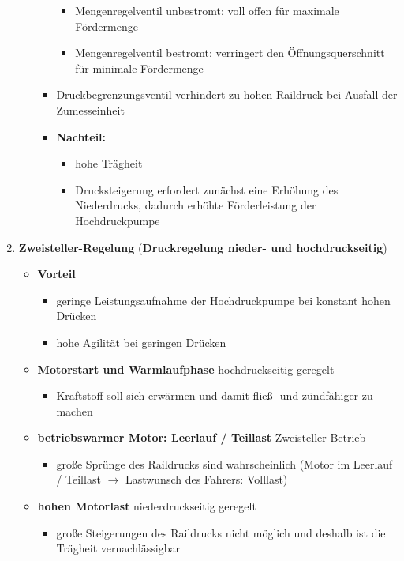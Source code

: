 \begin{enumerate}
\begin{itemize}
\begin{itemize}
      \begin{itemize}
      \item
        Mengenregelventil unbestromt: voll offen für maximale
        Fördermenge
      \item
        Mengenregelventil bestromt: verringert den Öffnungsquerschnitt
        für minimale Fördermenge\\
      \end{itemize}
    \item
      Druckbegrenzungsventil verhindert zu hohen Raildruck bei Ausfall
      der Zumesseinheit
    \item
      \textbf{Nachteil:}

      \begin{itemize}
      \item
        hohe Trägheit
      \item
        Drucksteigerung erfordert zunächst eine Erhöhung des
        Niederdrucks, dadurch erhöhte Förderleistung der Hochdruckpumpe
      \end{itemize}
    \end{itemize}
  \end{itemize}
\item
  \textbf{Zweisteller-Regelung} (\textbf{Druckregelung nieder- und
  hochdruckseitig})

  \begin{itemize}
  \item
    \textbf{Vorteil}

    \begin{itemize}
    \item
      geringe Leistungsaufnahme der Hochdruckpumpe bei konstant hohen
      Drücken
    \item
      hohe Agilität bei geringen Drücken
    \end{itemize}
  \item
    \textbf{Motorstart und Warmlaufphase} hochdruckseitig geregelt

    \begin{itemize}
    \item
      Kraftstoff soll sich erwärmen und damit fließ- und zündfähiger zu
      machen
    \end{itemize}
  \item
    \textbf{betriebswarmer Motor: Leerlauf / Teillast}
    Zweisteller-Betrieb

    \begin{itemize}
    \item
      große Sprünge des Raildrucks sind wahrscheinlich (Motor im
      Leerlauf / Teillast $\to$ Lastwunsch des Fahrers: Volllast)
    \end{itemize}
  \item
    \textbf{hohen Motorlast} niederdruckseitig geregelt

    \begin{itemize}
    \item
      große Steigerungen des Raildrucks nicht möglich und deshalb ist
      die Trägheit vernachlässigbar
    \end{itemize}
  \end{itemize}
\end{enumerate}


